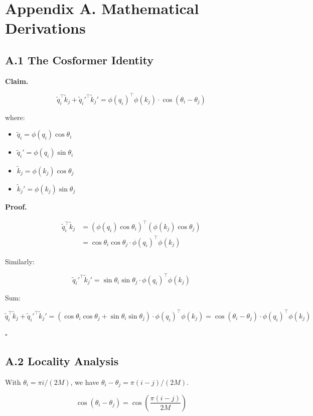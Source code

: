 
\section{Appendix A. Mathematical Derivations}

\subsection{A.1 The Cosformer Identity}

\textbf{Claim.}

\[
\tilde{q}_i^\top \tilde{k}_j + \tilde{q}_i'^\top \tilde{k}_j' = \phi(q_i)^\top \phi(k_j) \cdot \cos(\theta_i - \theta_j)
\]

where:
\begin{itemize}
\item $\tilde{q}_i = \phi(q_i) \cos\theta_i$
\item $\tilde{q}_i' = \phi(q_i) \sin\theta_i$
\item $\tilde{k}_j = \phi(k_j) \cos\theta_j$
\item $\tilde{k}_j' = \phi(k_j) \sin\theta_j$

\end{itemize}
\textbf{Proof.}

\[
\begin{aligned}
\tilde{q}_i^\top \tilde{k}_j &= (\phi(q_i) \cos\theta_i)^\top (\phi(k_j) \cos\theta_j) \\
&= \cos\theta_i \cos\theta_j \cdot \phi(q_i)^\top \phi(k_j)
\end{aligned}
\]

Similarly:

\[
\tilde{q}_i'^\top \tilde{k}_j' = \sin\theta_i \sin\theta_j \cdot \phi(q_i)^\top \phi(k_j)
\]

Sum:

\[
\tilde{q}_i^\top \tilde{k}_j + \tilde{q}_i'^\top \tilde{k}_j' = (\cos\theta_i \cos\theta_j + \sin\theta_i \sin\theta_j) \cdot \phi(q_i)^\top \phi(k_j) = \cos(\theta_i - \theta_j) \cdot \phi(q_i)^\top \phi(k_j)
\]

$\square$

\subsection{A.2 Locality Analysis}

With $\theta_i = \pi i / (2 M)$, we have $\theta_i - \theta_j = \pi (i - j) / (2 M)$.

\[
\cos(\theta_i - \theta_j) = \cos\!\left(\frac{\pi (i-j)}{2M}\right)
\]

